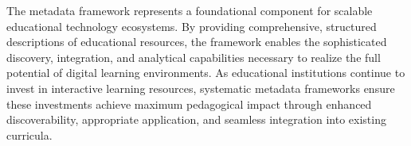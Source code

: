 The metadata framework represents a foundational component for scalable educational technology ecosystems. By providing comprehensive, structured descriptions of educational resources, the framework enables the sophisticated discovery, integration, and analytical capabilities necessary to realize the full potential of digital learning environments. As educational institutions continue to invest in interactive learning resources, systematic metadata frameworks ensure these investments achieve maximum pedagogical impact through enhanced discoverability, appropriate application, and seamless integration into existing curricula.
